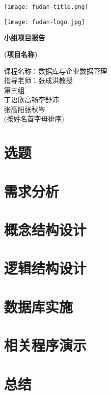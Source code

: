 \documentclass[12pt]{article}
\begin{document}
\thispagestyle{empty}
\begin{center}
	\texttt{[image: fudan-title.png]}
\end{center}
\vspace{0.3cm}
\begin{center}
	\texttt{[image: fudan-logo.jpg]}
\end{center}
\vspace{0.5cm}
\begin{center}
\Huge \textbf{小组项目报告}
\end{center}
\begin{center}
\Huge \textbf{(项目名称)}
\end{center}
\vspace{1cm}
\begin{center}
\begin{minipage}{0.57\linewidth}
\begin{flushleft}
\Large 课程名称：数据库与企业数据管理 \\
指导老师：张成洪\phantom{空}教授 \\
\vspace{0.5cm}
\phantom{空格空格空格}第三组 \\
\phantom{空}丁语欣\phantom{空格}高\phantom{空}畅\phantom{空格}李舒沛\\  
\phantom{空}张高阳\phantom{空格}张秋岑\\
\phantom{空格空}(按姓名首字母排序)
\end{flushleft}
\end{minipage}
\end{center}
\newpage
\tableofcontents
\newpage
\section{选题}
\section{需求分析}
\section{概念结构设计}
\section{逻辑结构设计}
\section{数据库实施}
\section{相关程序演示}
\section{总结}
\end{document}

